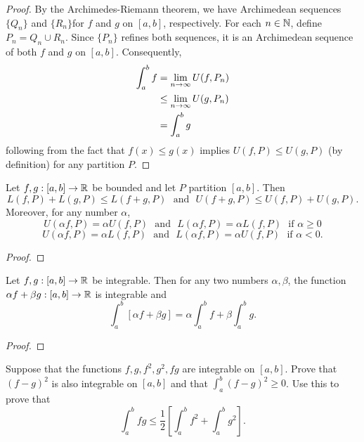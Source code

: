 \documentclass[letterpaper, twoside, 12pt]{book}
\begin{document}
\begin{proof}
    By the Archimedes-Riemann theorem, we have Archimedean sequences 
    \(\{Q_n\}\) and \(\{R_n\}\)for \(f\) and \(g\) on \([a,b]\), respectively. 
    For each \(n \in \mathbb N\), define \(P_n = Q_n \cup R_n\). Since \(\{P_n\}\)
    refines both sequences, it is an Archimedean sequence of both \(f\) and \(g\)
    on \([a,b]\). Consequently,
    \begin{align*}
        \int_a^b f &= \lim_{n \to \infty} U(f, P_n) \\
                   &\leq \lim_{n \to \infty} U(g, P_n) \\
                   &= \int_a^b g \\
    \end{align*}
    following from the fact that \(f(x) \leq g(x)\) implies \(U(f, P) \leq U(g, P)\)
    (by definition) for any partition \(P\).
\end{proof}


\begin{lemma}[6.14]
  Let \(f,g:[a,b]\to\mathbb R\) be bounded and let \(P\) partition \([a,b]\).
  Then
  \[
    L(f,P)+L(g,P)\leq L(f+g,P)
      \text{~~and~~}
    U(f+g,P)\leq U(f,P)+U(g,P)
  .\]
  Moreover, for any number \(\alpha\),
  \[
    U(\alpha f,P)=\alpha U(f,P)
      \text{~~and~~}
    L(\alpha f,P)=\alpha L(f,P)
      \text{~~if~}
    \alpha\geq 0
  \]
  \[
    U(\alpha f,P)=\alpha L(f,P)
      \text{~~and~~}
    L(\alpha f,P)=\alpha U(f,P)
      \text{~~if~}
    \alpha< 0
  .\]
\end{lemma}
\begin{proof}

\end{proof}


\begin{theorem}
  Let \(f,g:[a,b]\to\mathbb R\) be integrable. Then for any two numbers
  \(\alpha,\beta\), the function \(\alpha f+\beta g:[a,b]\to\mathbb R\) is
  integrable and
  \[
    \int_a^b[\alpha f+\beta g]=\alpha\int_a^b f + \beta\int_a^b g
  .\]
\end{theorem}
\begin{proof}

\end{proof}


\begin{exercise}[1]
  Suppose that the functions \(f,g,f^2,g^2,fg\) are integrable on \([a,b]\).
  Prove that \((f-g)^2\) is also integrable on \([a,b]\) and that
  \(\int_a^b(f-g)^2\geq0\). Use this to prove that
  \[
    \int_a^b fg
      \leq
    \frac{1}{2}\left[
      \int_a^b f^2 + \int_a^b g^2
    \right]
  .\]
\end{exercise}
\begin{solution}

\end{solution}
\end{document}
